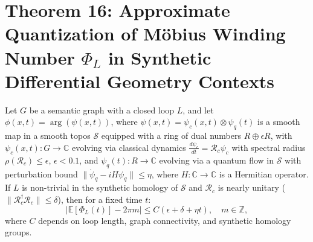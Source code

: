 \documentclass[12pt]{article}
\begin{document}
\section*{Theorem 16: Approximate Quantization of Möbius Winding Number \(\Phi_L\) in Synthetic Differential Geometry Contexts}

\begin{theorem}
Let \(G\) be a semantic graph with a closed loop \(L\), and let \(\phi(x,t) = \arg(\psi(x,t))\), where \(\psi(x,t) = \psi_c(x,t) \otimes \psi_q(t)\) is a smooth map in a smooth topos \(\mathcal{S}\) equipped with a ring of dual numbers \(R \oplus \epsilon R\), with \(\psi_c(x,t): G \to \mathbb{C}\) evolving via classical dynamics \(\frac{d\psi_c}{dt} = \mathcal{R}_c \psi_c\) with spectral radius \(\rho(\mathcal{R}_c) \leq \epsilon\), \(\epsilon < 0.1\), and \(\psi_q(t): R \to \mathbb{C}\) evolving via a quantum flow in \(\mathcal{S}\) with perturbation bound \(\|\dot{\psi}_q - i H \psi_q\| \leq \eta\), where \(H: \mathbb{C} \to \mathbb{C}\) is a Hermitian operator. If \(L\) is non-trivial in the synthetic homology of \(\mathcal{S}\) and \(\mathcal{R}_c\) is nearly unitary (\(\|\mathcal{R}_c^\dagger \mathcal{R}_c\| \leq \delta\)), then for a fixed time \(t\):
\[
\left| \mathbb{E}[\Phi_L(t)] - 2\pi m \right| \leq C (\epsilon + \delta + \eta t), \quad m \in \mathbb{Z},
\]
where \(C\) depends on loop length, graph connectivity, and synthetic homology groups.
\end{theorem}
\end{document}
